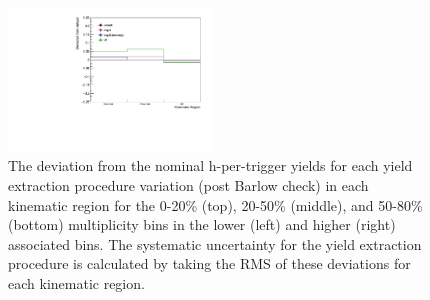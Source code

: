 \begin{figure}[ht]
    \includegraphics[width=0.48\textwidth]{figures/analysis/h_lambda_50_80_highpt_yield_variation.pdf}
    \caption{The deviation from the nominal h-\lmb per-trigger yields for each yield extraction procedure variation (post Barlow check) in each kinematic region for the 0-20\% (top), 20-50\% (middle), and 50-80\% (bottom) multiplicity bins in the lower (left) and higher (right) associated \pt bins. The systematic uncertainty for the yield extraction procedure is calculated by taking the RMS of these deviations for each kinematic region.}
    \label{fig:h_lambda_yield_deviations}
\end{figure}

